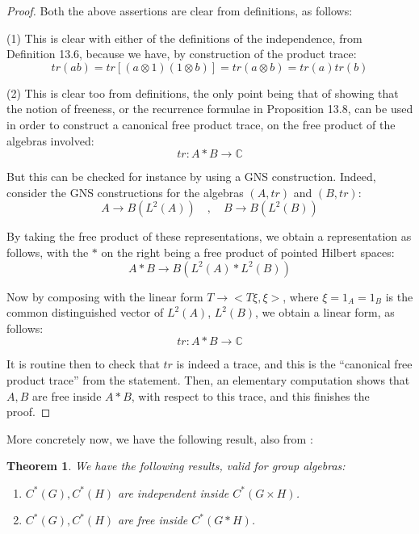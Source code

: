 \documentclass[12pt]{amsbook}
\newtheorem{theorem}{Theorem}[chapter]
\begin{document}
\begin{proof}
Both the above assertions are clear from definitions, as follows:

\medskip

(1) This is clear with either of the definitions of the independence, from Definition 13.6, because we have, by construction of the product trace:
$$tr(ab)
=tr[(a\otimes1)(1\otimes b)]
=tr(a\otimes b)
=tr(a)tr(b)$$

(2) This is clear too from definitions, the only point being that of showing that the notion of freeness, or the recurrence formulae in Proposition 13.8, can be used in order to construct a canonical free product trace, on the free product of the algebras involved:
$$tr:A*B\to\mathbb C$$

But this can be checked for instance by using a GNS construction. Indeed, consider the GNS constructions for the algebras $(A,tr)$ and $(B,tr)$:
$$A\to B(L^2(A))\quad,\quad
B\to B(L^2(B))$$

By taking the free product of these representations, we obtain a representation as follows, with the $*$ on the right being a free product of pointed Hilbert spaces:
$$A*B\to B(L^2(A)*L^2(B))$$

Now by composing with the linear form $T\to<T\xi,\xi>$, where $\xi=1_A=1_B$ is the common distinguished vector of $L^2(A)$, $L^2(B)$, we obtain a linear form, as follows:
$$tr:A*B\to\mathbb C$$

It is routine then to check that $tr$ is indeed a trace, and this is the ``canonical free product trace'' from the statement. Then, an elementary computation shows that $A,B$ are free inside $A*B$, with respect to this trace, and this finishes the proof.
\end{proof}

More concretely now, we have the following result, also from \cite{vo1}:

\begin{theorem}
We have the following results, valid for group algebras:
\begin{enumerate}
\item $C^*(G),C^*(H)$ are independent inside $C^*(G\times H)$.

\item $C^*(G),C^*(H)$ are free inside $C^*(G*H)$.
\end{enumerate}
\end{theorem}
\end{document}
